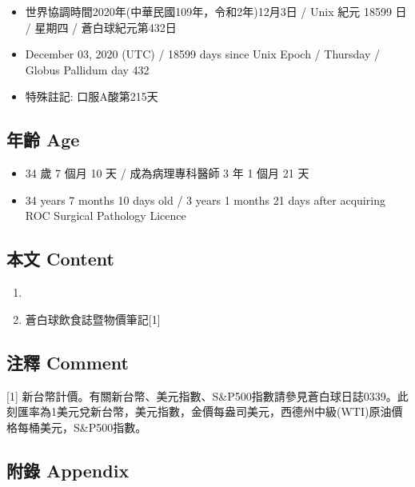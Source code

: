 \documentclass[
]{article}
\providecommand{\tightlist}{%
  \setlength{\itemsep}{0pt}\setlength{\parskip}{0pt}}
\begin{document}
\begin{itemize}
\tightlist
\item
  世界協調時間2020年(中華民國109年，令和2年)12月3日 / Unix 紀元 18599 日
  / 星期四 / 蒼白球紀元第432日
\item
  December 03, 2020 (UTC) / 18599 days since Unix Epoch / Thursday /
  Globus Pallidum day 432
\item
  特殊註記: 口服A酸第215天
\end{itemize}

\hypertarget{ux5e74ux9f61-age-2}{%
\subsection{年齡 Age}\label{ux5e74ux9f61-age-2}}

\begin{itemize}
\tightlist
\item
  34 歲 7 個月 10 天 / 成為病理專科醫師 3 年 1 個月 21 天
\item
  34 years 7 months 10 days old / 3 years 1 months 21 days after
  acquiring ROC Surgical Pathology Licence
\end{itemize}

\hypertarget{ux672cux6587-content-2}{%
\subsection{本文 Content}\label{ux672cux6587-content-2}}

\begin{enumerate}
\def\labelenumi{\arabic{enumi}.}
\tightlist
\item
\item
  蒼白球飲食誌暨物價筆記{[}1{]}
\end{enumerate}

\hypertarget{ux6ce8ux91cb-comment-2}{%
\subsection{注釋 Comment}\label{ux6ce8ux91cb-comment-2}}

{[}1{]}
新台幣計價。有關新台幣、美元指數、S\&P500指數請參見蒼白球日誌0339。此刻匯率為1美元兌新台幣，美元指數，金價每盎司美元，西德州中級(WTI)原油價格每桶美元，S\&P500指數。

\hypertarget{ux9644ux9304-appendix-2}{%
\subsection{附錄 Appendix}\label{ux9644ux9304-appendix-2}}
\end{document}
